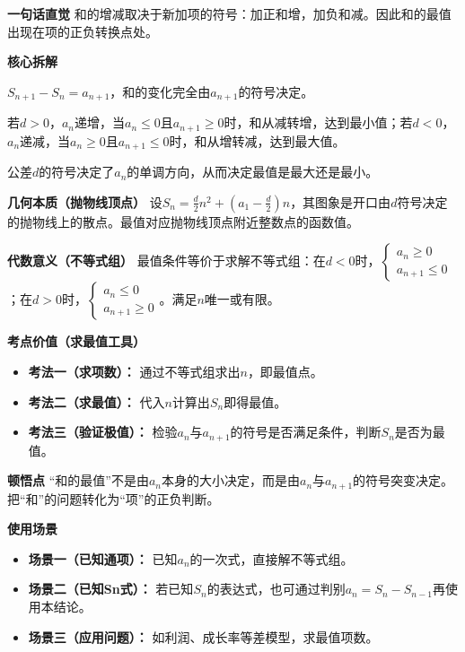 \begin{explanationbox}
	\textbf{\textcolor{CExplanation}{一句话直觉}}
	和的增减取决于新加项的符号：加正和增，加负和减。因此和的最值出现在项的正负转换点处。

	\medskip
	\textbf{\textcolor{CExplanation}{核心拆解}}
	\begin{description}[style=nextline, leftmargin=2.8em, labelsep=0.5em, itemsep=0.45em]
		\item[\textbf{要点一（和差关系）：}]
			$S_{n+1}-S_n = a_{n+1}$，和的变化完全由$a_{n+1}$的符号决定。
		\item[\textbf{要点二（符号拐点）：}]
			若$d>0$，$a_n$递增，当$a_n\le 0$且$a_{n+1}\ge 0$时，和从减转增，达到最小值；若$d<0$，$a_n$递减，当$a_n\ge 0$且$a_{n+1}\le 0$时，和从增转减，达到最大值。
		\item[\textbf{要点三（公差作用）：}]
			公差$d$的符号决定了$a_n$的单调方向，从而决定最值是最大还是最小。
	\end{description}

	\medskip
	\textbf{\textcolor{CExplanation}{几何本质（抛物线顶点）}}
	设$S_n = \frac{d}{2}n^2 + (a_1-\frac{d}{2})n$，其图象是开口由$d$符号决定的抛物线上的散点。最值对应抛物线顶点附近整数点的函数值。

	\medskip
	\textbf{\textcolor{CExplanation}{代数意义（不等式组）}}
	最值条件等价于求解不等式组：在$d<0$时，$
	\begin{cases}
		a_n\ge0\\ a_{n+1}\le0
	\end{cases}
	$；在$d>0$时，$
	\begin{cases}
		a_n\le0\\ a_{n+1}\ge0
	\end{cases}
	$。满足$n$唯一或有限。

	\medskip
	\textbf{\textcolor{CExplanation}{考点价值（求最值工具）}}
	\begin{itemize}[leftmargin=*, itemsep=0.5em, topsep=0.4em]
		\item \textbf{考法一（求项数）：} 通过不等式组求出$n$，即最值点。
		\item \textbf{考法二（求最值）：} 代入$n$计算出$S_n$即得最值。
		\item \textbf{考法三（验证极值）：} 检验$a_n$与$a_{n+1}$的符号是否满足条件，判断$S_n$是否为最值。
	\end{itemize}

	\medskip
	\textbf{\textcolor{CExplanation}{顿悟点}}
	“和的最值”不是由$a_n$本身的大小决定，而是由$a_n$与$a_{n+1}$的符号突变决定。把“和”的问题转化为“项”的正负判断。

	\medskip
	\textbf{\textcolor{CExplanation}{使用场景}}
	\begin{itemize}[leftmargin=*, itemsep=0.5em, topsep=0.4em]
		\item \textbf{场景一（已知通项）：} 已知$a_n$的一次式，直接解不等式组。
		\item \textbf{场景二（已知Sn式）：} 若已知$S_n$的表达式，也可通过判别$a_n = S_n - S_{n-1}$再使用本结论。
		\item \textbf{场景三（应用问题）：} 如利润、成长率等差模型，求最值项数。
	\end{itemize}

\end{explanationbox}
